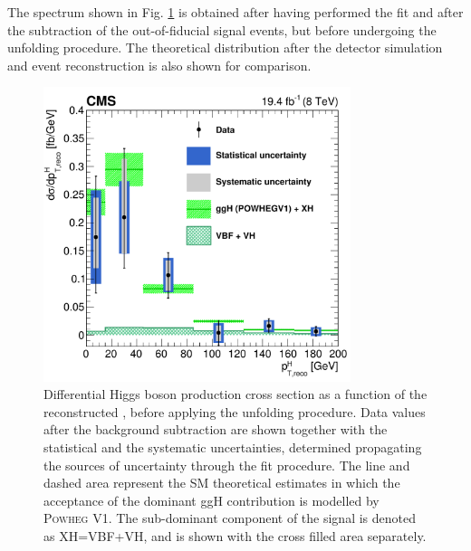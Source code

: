 The spectrum shown in Fig. \ref{fig:pre_unfolding} is obtained after having performed the fit and after the subtraction of the out-of-fiducial signal events, but before undergoing the unfolding procedure. The theoretical distribution after the detector simulation and event reconstruction is also shown for comparison.

\begin{figure}[!h]
\centering
\includegraphics[width=0.8\textwidth]{images/unblinding/pth_reco_paper.pdf}
\caption{Differential Higgs boson production cross section as a function of the reconstructed \pth{}, before applying the unfolding procedure. Data values after the background subtraction are shown together with the statistical and the systematic uncertainties, determined propagating the sources of uncertainty through the fit procedure. The line and dashed area represent the SM theoretical estimates in which the acceptance of the dominant ggH contribution is modelled by \textsc{Powheg V1}. The sub-dominant component of the signal is denoted as XH=VBF+VH, and is shown with the cross filled area separately.}\label{fig:pre_unfolding}
\end{figure}


